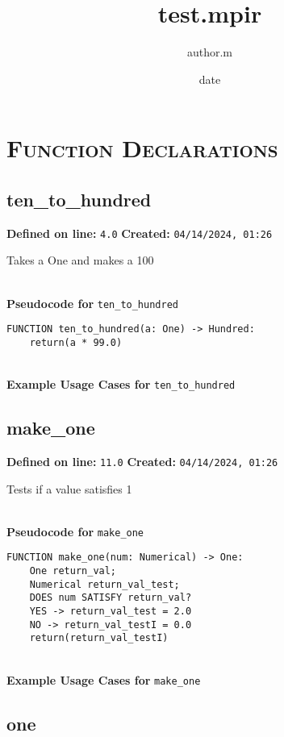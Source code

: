 \documentclass{article}
\title{test.mpir}
\author{author.m}
\date{date}
\begin{document}
\maketitle
\clearpage
\tableofcontents
\clearpage

\section{\textsc{Function Declarations}}

\subsection{ten\_to\_hundred}

\textbf{Defined on line:} \verb|4.0| \hfill \textbf{Created:} \verb|04/14/2024, 01:26| 


Takes a One and makes a 100

\textbf{\\ Pseudocode for } \texttt{ten\_to\_hundred}
\begin{verbatim}
FUNCTION ten_to_hundred(a: One) -> Hundred:
	return(a * 99.0)
\end{verbatim}

\textbf{\\ Example Usage Cases for } \texttt{ten\_to\_hundred}
\clearpage

\subsection{make\_one}

\textbf{Defined on line:} \verb|11.0| \hfill \textbf{Created:} \verb|04/14/2024, 01:26| 


Tests if a value satisfies 1

\textbf{\\ Pseudocode for } \texttt{make\_one}
\begin{verbatim}
FUNCTION make_one(num: Numerical) -> One:
	One return_val;
	Numerical return_val_test;
	DOES num SATISFY return_val?
	YES -> return_val_test = 2.0
	NO -> return_val_testI = 0.0
	return(return_val_testI)
\end{verbatim}

\textbf{\\ Example Usage Cases for } \texttt{make\_one}
\clearpage

\subsection{one}
\end{document}
